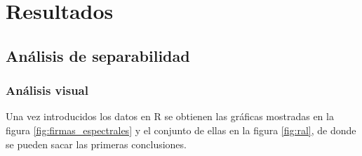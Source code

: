 


\chapter{Resultados}
\label{cap:resultados}

\section{Análisis de separabilidad}
\subsection{Análisis visual}
Una vez introducidos los datos en R se obtienen las gráficas mostradas en la figura \ref{fig:firmas_espectrales} y el conjunto de ellas en la figura \ref{fig:ral}, de donde se pueden sacar las primeras conclusiones.\Sep

